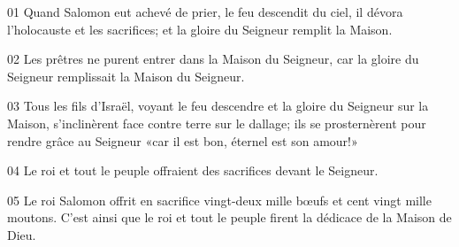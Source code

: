 01 Quand Salomon eut achevé de prier, le feu descendit du ciel, il dévora l’holocauste et les sacrifices; et la gloire du Seigneur remplit la Maison.

02 Les prêtres ne purent entrer dans la Maison du Seigneur, car la gloire du Seigneur remplissait la Maison du Seigneur.

03 Tous les fils d’Israël, voyant le feu descendre et la gloire du Seigneur sur la Maison, s’inclinèrent face contre terre sur le dallage; ils se prosternèrent pour rendre grâce au Seigneur «car il est bon, éternel est son amour!»

04 Le roi et tout le peuple offraient des sacrifices devant le Seigneur.

05 Le roi Salomon offrit en sacrifice vingt-deux mille bœufs et cent vingt mille moutons. C’est ainsi que le roi et tout le peuple firent la dédicace de la Maison de Dieu.
